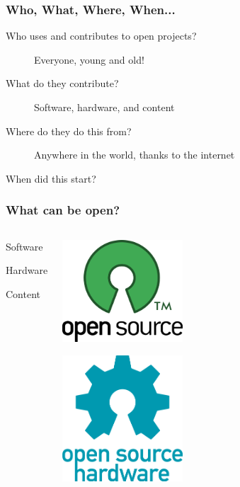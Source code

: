 \documentclass{beamer}
\begin{document}
\begin{frame}
  \frametitle{Who, What, Where, When...}
  \begin{description}
  \item[Who uses and contributes to open projects?] Everyone, young and old!
  \item[What do they contribute?] Software, hardware, and content
  \item[Where do they do this from?] Anywhere in the world, thanks to the internet
  \item[When did this start?] 
  \end{description}
\end{frame}

\begin{frame}
  \frametitle{What can be open?}
  \begin{columns}
    \begin{center}
      \begin{LARGE}Software\end{LARGE}
      
      \vspace{5em}

      \begin{LARGE}Hardware\end{LARGE}

      \vspace{5em}

      \begin{LARGE}Content\end{LARGE}
    \end{center}
    \begin{center}
      \includegraphics[width=0.4\textwidth]{img/opensource}

      \vspace{1em}

      \includegraphics[width=0.4\textwidth]{img/opensourcehardware.png}


\end{center}
\end{columns}
\end{frame}
\end{document}
